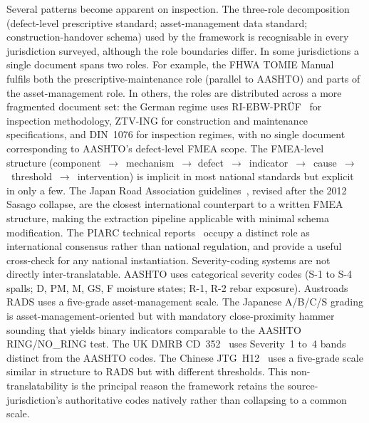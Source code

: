 \documentclass[11pt,a4paper]{article}
\begin{document}
Several patterns become apparent on inspection. The three-role decomposition (defect-level prescriptive standard; asset-management data standard; construction-handover schema) used by the framework is recognisable in every jurisdiction surveyed, although the role boundaries differ. In some jurisdictions a single document spans two roles. For example, the FHWA TOMIE Manual~\citep{FHWA2015} fulfils both the prescriptive-maintenance role (parallel to AASHTO) and parts of the asset-management role. In others, the roles are distributed across a more fragmented document set: the German regime uses RI-EBW-PR\"UF~\citep{RIEBWPRUEF} for inspection methodology, ZTV-ING for construction and maintenance specifications, and DIN~1076 for inspection regimes, with no single document corresponding to AASHTO's defect-level FMEA scope. The FMEA-level structure (component~$\to$~mechanism~$\to$ defect~$\to$~indicator~$\to$~cause~$\to$~threshold~$\to$~intervention) is implicit in most national standards but explicit in only a few. The Japan Road Association guidelines~\citep{JRA2019}, revised after the 2012 Sasago collapse, are the closest international counterpart to a written FMEA structure, making the extraction pipeline applicable with minimal schema modification. The PIARC technical reports~\citep{PIARC2017} occupy a distinct role as international consensus rather than national regulation, and provide a useful cross-check for any national instantiation. Severity-coding systems are not directly inter-translatable. AASHTO uses categorical severity codes (S-1 to S-4 spalls; D, PM, M, GS, F moisture states; R-1, R-2 rebar exposure). Austroads RADS uses a five-grade asset-management scale. The Japanese A/B/C/S grading is asset-management-oriented but with mandatory close-proximity hammer sounding that yields binary indicators comparable to the AASHTO RING/NO\_RING test. The UK DMRB CD~352~\citep{DMRB2020} uses Severity~1 to~4 bands distinct from the AASHTO codes. The Chinese JTG~H12~\citep{JTGH122015} uses a five-grade scale similar in structure to RADS but with different thresholds. This non-translatability is the principal reason the framework retains the source-jurisdiction's authoritative codes natively rather than collapsing to a common scale.
\end{document}
